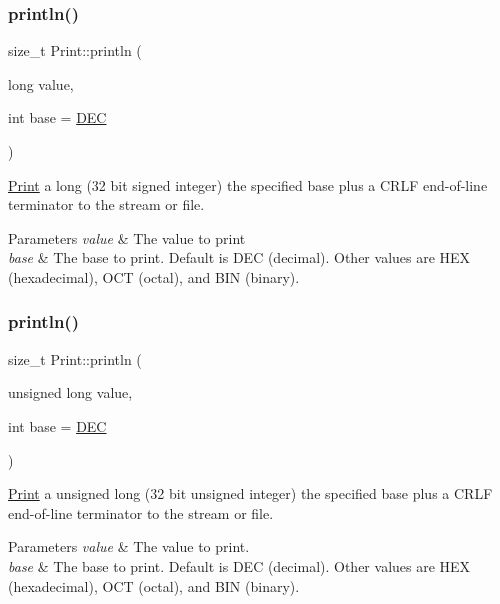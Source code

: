 \subsubsection{\texorpdfstring{println()}{println()}\hspace{0.1cm}{\footnotesize\ttfamily [16/21]}}
{\footnotesize\ttfamily size\+\_\+t Print\+::println (\begin{DoxyParamCaption}\item[{long}]{value,  }\item[{int}]{base = {\ttfamily \hyperlink{docs_2src_2spark__wiring__print_8h_a26e216c38cffa0a9965fa7933ba558b1}{D\+EC}} }\end{DoxyParamCaption})}



\hyperlink{class_print}{Print} a long (32 bit signed integer) the specified base plus a C\+R\+LF end-\/of-\/line terminator to the stream or file. 


\begin{DoxyParams}{Parameters}
{\em value} & The value to print \\
\hline
{\em base} & The base to print. Default is D\+EC (decimal). Other values are H\+EX (hexadecimal), O\+CT (octal), and B\+IN (binary). \\
\hline
\end{DoxyParams}
\mbox{\label{class_print_afa936d7e8dd329d9162f2cd28f42681e}} 
\subsubsection{\texorpdfstring{println()}{println()}\hspace{0.1cm}{\footnotesize\ttfamily [17/21]}}
{\footnotesize\ttfamily size\+\_\+t Print\+::println (\begin{DoxyParamCaption}\item[{unsigned long}]{value,  }\item[{int}]{base = {\ttfamily \hyperlink{docs_2src_2spark__wiring__print_8h_a26e216c38cffa0a9965fa7933ba558b1}{D\+EC}} }\end{DoxyParamCaption})}



\hyperlink{class_print}{Print} a unsigned long (32 bit unsigned integer) the specified base plus a C\+R\+LF end-\/of-\/line terminator to the stream or file. 


\begin{DoxyParams}{Parameters}
{\em value} & The value to print. \\
\hline
{\em base} & The base to print. Default is D\+EC (decimal). Other values are H\+EX (hexadecimal), O\+CT (octal), and B\+IN (binary). \\
\hline
\end{DoxyParams}
\mbox{\label{class_print_a178b90baf9f74f0945f5c64aafec59ea}} 
